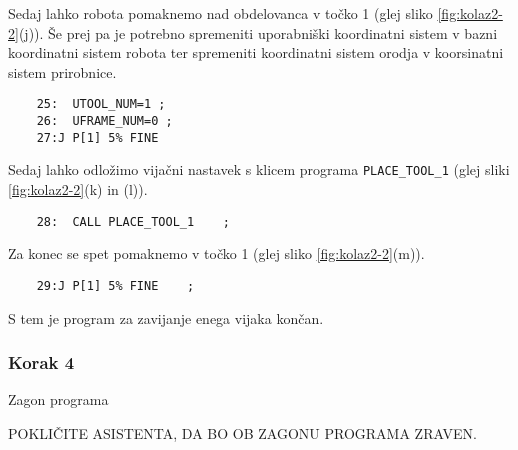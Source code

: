Sedaj lahko robota pomaknemo nad obdelovanca v točko 1 (glej sliko \ref{fig:kolaz2-2}(j)). Še prej pa je potrebno spremeniti uporabniški koordinatni sistem v bazni koordinatni sistem robota ter spremeniti koordinatni sistem orodja v koorsinatni sistem prirobnice.

\vspace{0.35cm}
\begin{mdframed}[backgroundcolor=orange!20, shadow=true,roundcorner=8pt]
	
	\begin{verbatim}
	25:  UTOOL_NUM=1 ;
	26:  UFRAME_NUM=0 ;
	27:J P[1] 5% FINE 
	\end{verbatim}
	
\end{mdframed} 

Sedaj lahko odložimo vijačni nastavek s klicem programa \verb*|PLACE_TOOL_1| (glej sliki \ref{fig:kolaz2-2}(k) in (l)).

\vspace{0.35cm}
\begin{mdframed}[backgroundcolor=orange!20, shadow=true,roundcorner=8pt]
	
	\begin{verbatim}
	28:  CALL PLACE_TOOL_1    ;
	\end{verbatim}
	
\end{mdframed} 

Za konec se spet pomaknemo v točko 1 (glej sliko \ref{fig:kolaz2-2}(m)).

\vspace{0.35cm}
\begin{mdframed}[backgroundcolor=orange!20, shadow=true,roundcorner=8pt]
	
	\begin{verbatim}
	29:J P[1] 5% FINE    ;
	\end{verbatim}
	
\end{mdframed} 

S tem je program za zavijanje enega vijaka končan. 

\subsubsection{Korak 4} Zagon programa

\vspace{0.35cm}
\begin{mdframed}[backgroundcolor=red!20, shadow=true,roundcorner=8pt]
	
POKLIČITE ASISTENTA, DA BO OB ZAGONU PROGRAMA ZRAVEN.
	
\end{mdframed}

